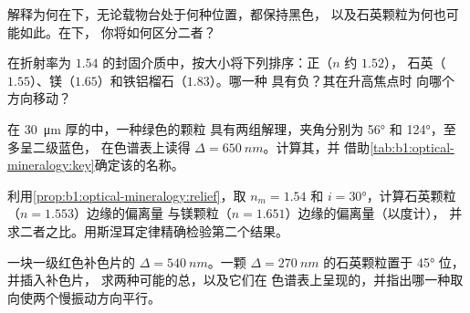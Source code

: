\begin{exercise}[$\star$]\label{exo:b1:optical-mineralogy:3}
解释为何在下，无论载物台处于何种位置，都保持黑色，
以及石英颗粒为何也可能如此。在下，
你将如何区分二者？
\end{exercise}

\begin{exercise}[$\star$]\label{exo:b1:optical-mineralogy:4}
在折射率为 $1.54$ 的封固介质中，按大小将下列排序：正（$n$ 约 $1.52$），
石英（$1.55$）、镁（$1.65$）和铁铝榴石（$1.83$）。哪一种
具有负？其在升高焦点时
向哪个方向移动？
\end{exercise}

\begin{exercise}[$\star\star$]\label{exo:b1:optical-mineralogy:5}
在 \qty{30}{\micro m} 厚的中，一种绿色的颗粒
具有两组解理，夹角分别为 \ang{56} 和 \ang{124}，至多呈二级蓝色，
在色谱表上读得 $\Delta = \qty{650}{nm}$。计算其，并
借助\cref{tab:b1:optical-mineralogy:key}确定该的名称。
\end{exercise}

\begin{exercise}[$\star\star$]\label{exo:b1:optical-mineralogy:6}
利用\cref{prop:b1:optical-mineralogy:relief}，取 $n_m = 1.54$ 和
$i = \ang{30}$，计算石英颗粒（$n = 1.553$）边缘的偏离量
与镁颗粒（$n = 1.651$）边缘的偏离量（以度计），
并求二者之比。用斯涅耳定律精确检验第二个结果。
\end{exercise}

\begin{exercise}[$\star\star$]\label{exo:b1:optical-mineralogy:7}
一块一级红色补色片的 $\Delta = \qty{540}{nm}$。一颗
$\Delta = \qty{270}{nm}$ 的石英颗粒置于 \ang{45} 位，并插入补色片，
求两种可能的总，以及它们在
色谱表上呈现的，并指出哪一种取向使两个慢振动方向平行。
\end{exercise}

